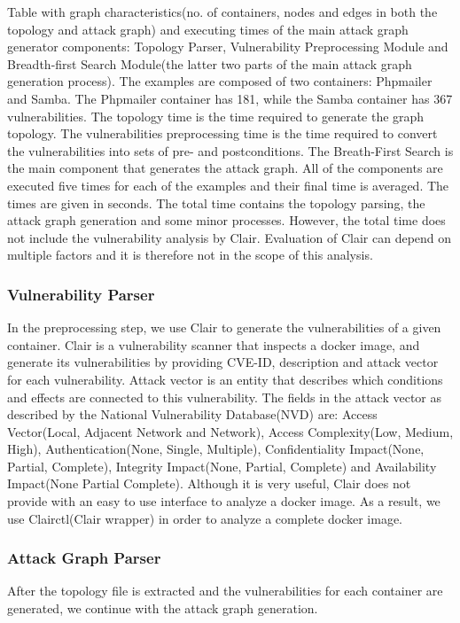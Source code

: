 \documentclass[letterpaper, 10 pt, conference]{ieeeconf}  %
\begin{document}
\begin{table}
	\caption{Table with graph characteristics(no. of containers, nodes and edges in both the topology and attack graph) and executing times of the main attack graph generator components: Topology Parser, Vulnerability Preprocessing Module and Breadth-first Search Module(the latter two parts of the main attack graph generation process). The examples are composed of two containers: Phpmailer and Samba. The Phpmailer container has 181, while the Samba container has 367 vulnerabilities. The topology time is the time required to generate the graph topology. The vulnerabilities preprocessing time is the time required to convert the vulnerabilities into sets of pre- and postconditions. The Breath-First Search is the main component that generates the attack graph. All of the components are executed five times for each of the examples and their final time is averaged. The times are given in seconds. The total time contains the topology parsing, the attack graph generation and some minor processes. However, the total time does not include the vulnerability analysis by Clair. Evaluation of Clair can depend on multiple factors and it is therefore not in the scope of this analysis.}
	
	\label{table_scalability}
\end{table}

\subsubsection{Vulnerability Parser}
In the preprocessing step, we use Clair to generate the vulnerabilities of a given container. Clair is a vulnerability scanner that inspects a docker image, and generate its vulnerabilities by providing CVE-ID, description and attack vector for each vulnerability. Attack vector is an entity that describes which conditions and effects are connected to this vulnerability. The fields in the attack vector as described by the National Vulnerability Database(NVD) are: Access Vector(Local, Adjacent Network and Network), Access Complexity(Low, Medium, High), Authentication(None, Single, Multiple), Confidentiality Impact(None, Partial, Complete), Integrity Impact(None, Partial, Complete) and Availability Impact(None Partial Complete). Although it is very useful, Clair does not provide with an easy to use interface to analyze a docker image. As a result, we use Clairctl(Clair wrapper) in order to analyze a complete docker image.


\subsubsection{Attack Graph Parser}
After the topology file is extracted and the vulnerabilities for each container are generated, we continue with the attack graph generation.
\end{document}
